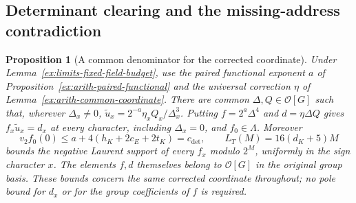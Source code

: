 \documentclass[11pt]{article}
\newtheorem{proposition}[theorem]{Proposition}
\theoremstyle{definition}
\theoremstyle{remark}
\providecommand{\mathscr}[1]{\mathcal{#1}}
\begin{document}
\subsection{Determinant clearing and the missing-address contradiction}
\begin{proposition}[A common denominator for the corrected coordinate]\label{ex:limits-fixed-field-clearing}
Under Lemma~\ref{ex:limits-fixed-field-budget}, use the paired
functional exponent $a$ of
Proposition~\ref{ex:arith-paired-functional} and the universal
correction $\eta$ of Lemma~\ref{ex:arith-common-coordinate}.
There are common $\Delta,Q\in\mathscr O[G]$ such that, wherever
$\Delta_x\ne0$,
$\widetilde u_x=2^{-a}\eta_xQ_x/\Delta_x^3$.
Putting $f=2^a\Delta^4$ and $d=\eta\Delta Q$ gives
$f_x\widetilde u_x=d_x$ at every character, including
$\Delta_x=0$, and $f_0\in\Lambda$. Moreover
\[
 v_2f_0(0)\leq a+4(h_K+2c_E+2t_K)=c_{\det},\qquad
 L_T(M)=16(d_K+5)M
\]
bounds the negative Laurent support of every $f_x$ modulo $2^M$,
uniformly in the sign character $x$. The elements $f,d$ themselves
belong to $\mathscr O[G]$ in the original group basis.
These bounds concern the same corrected coordinate throughout;
no pole bound for $d_x$ or for the group coefficients of $f$ is required.
\end{proposition}
\end{document}
